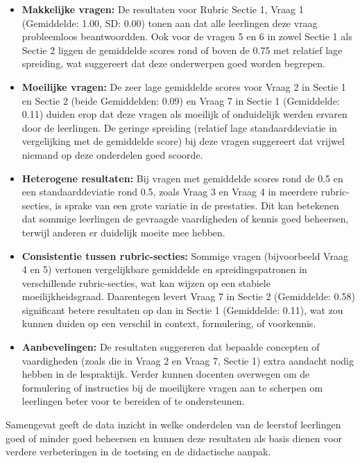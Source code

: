 \documentclass[12pt]{article}
\begin{document}
\noindent\begin{itemize}
    \item \textbf{Makkelijke vragen:} De resultaten voor Rubric Sectie 1, Vraag 1 (Gemiddelde: 1.00, SD: 0.00) tonen aan dat alle leerlingen deze vraag probleemloos beantwoordden. Ook voor de vragen 5 en 6 in zowel Sectie 1 als Sectie 2 liggen de gemiddelde scores rond of boven de 0.75 met relatief lage spreiding, wat suggereert dat deze onderwerpen goed worden begrepen.
    
    \item \textbf{Moeilijke vragen:} De zeer lage gemiddelde scores voor Vraag 2 in Sectie 1 en Sectie 2 (beide Gemiddelden: 0.09) en Vraag 7 in Sectie 1 (Gemiddelde: 0.11) duiden erop dat deze vragen als moeilijk of onduidelijk werden ervaren door de leerlingen. De geringe spreiding (relatief lage standaarddeviatie in vergelijking met de gemiddelde score) bij deze vragen suggereert dat vrijwel niemand op deze onderdelen goed scoorde.
    
    \item \textbf{Heterogene resultaten:} Bij vragen met gemiddelde scores rond de 0.5 en een standaarddeviatie rond 0.5, zoals Vraag 3 en Vraag 4 in meerdere rubric-secties, is sprake van een grote variatie in de prestaties. Dit kan betekenen dat sommige leerlingen de gevraagde vaardigheden of kennis goed beheersen, terwijl anderen er duidelijk moeite mee hebben.
    
    \item \textbf{Consistentie tussen rubric-secties:} Sommige vragen (bijvoorbeeld Vraag 4 en 5) vertonen vergelijkbare gemiddelde en spreidingspatronen in verschillende rubric-secties, wat kan wijzen op een stabiele moeilijkheidsgraad. Daarentegen levert Vraag 7 in Sectie 2 (Gemiddelde: 0.58) significant betere resultaten op dan in Sectie 1 (Gemiddelde: 0.11), wat zou kunnen duiden op een verschil in context, formulering, of voorkennis.
    
    \item \textbf{Aanbevelingen:}  
    De resultaten suggereren dat bepaalde concepten of vaardigheden (zoals die in Vraag 2 en Vraag 7, Sectie 1) extra aandacht nodig hebben in de lespraktijk. Verder kunnen docenten overwegen om de formulering of instructies bij de moeilijkere vragen aan te scherpen om leerlingen beter voor te bereiden of te ondersteunen.
\end{itemize}

Samengevat geeft de data inzicht in welke onderdelen van de leerstof leerlingen goed of minder goed beheersen en kunnen deze resultaten als basis dienen voor verdere verbeteringen in de toetsing en de didactische aanpak.
\end{document}
